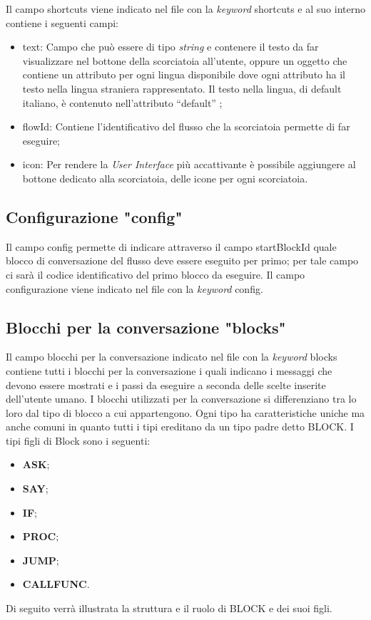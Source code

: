 Il campo shortcuts viene indicato nel file con la \emph{keyword} shortcuts
e al suo interno contiene i seguenti campi:
\begin{itemize}
	\item text: Campo che può essere di tipo \emph{string} e contenere il testo da far visualizzare nel bottone della scorciatoia all'utente, oppure un oggetto che contiene un attributo per ogni lingua disponibile dove ogni attributo ha il testo nella lingua straniera rappresentato. Il testo nella lingua, di default italiano, è contenuto nell’attributo “default” ;
	\item flowId: Contiene l'identificativo del flusso che la scorciatoia permette di far eseguire;
	\item icon: Per rendere la \emph{User Interface} più accattivante è possibile aggiungere al bottone dedicato alla scorciatoia, delle icone per ogni scorciatoia.
\end{itemize}

\subsection{Configurazione "config"}
Il campo config permette di indicare attraverso il campo startBlockId quale blocco di conversazione del flusso deve essere eseguito per primo; per tale campo ci sarà il codice identificativo del primo blocco da eseguire. Il campo configurazione viene indicato nel file con la \emph{keyword} config.

\subsection{Blocchi per la conversazione "blocks"}
Il campo blocchi per la conversazione indicato nel file con la \emph{keyword} blocks contiene tutti i blocchi per la conversazione i quali indicano i messaggi che devono essere mostrati e i passi da eseguire a seconda delle scelte inserite dell'utente umano.
I blocchi utilizzati per la conversazione si differenziano tra lo loro dal tipo di blocco a cui appartengono. Ogni tipo ha caratteristiche uniche ma anche comuni in quanto tutti i tipi ereditano da un tipo padre detto BLOCK. I tipi figli di Block sono i seguenti:
\begin{itemize}
	\item\textbf{ASK};
	\item\textbf{SAY};
	\item\textbf{IF};
	\item\textbf{PROC};
	\item\textbf{JUMP};
	\item\textbf{CALLFUNC}.
\end{itemize}
Di seguito verrà illustrata la struttura e il ruolo di BLOCK e dei suoi figli.
